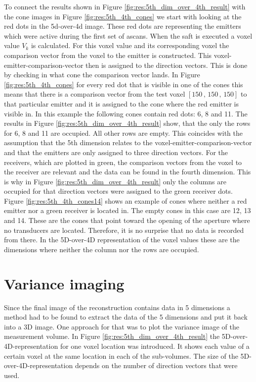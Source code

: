 To connect the results shown in Figure \ref{fig:res:5th_dim_over_4th_result} with the cone images in Figure \ref{fig:res:5th_4th_cones} we start with looking at the red dots in the 5d-over-4d image. These red dots are representing the emitters which were active during the first set of \acp{ascan}. When the \ac{saft} is executed a voxel value $V_k$ is calculated. For this voxel value and its corresponding voxel the comparison vector from the voxel to the emitter is constructed. This voxel-emitter-comparison-vector then is assigned to the direction vectors. This is done by checking in what cone the comparison vector lands. In Figure \ref{fig:res:5th_4th_cones} for every red dot that is visible in one of the cones this means that there is a comparison vector from the test voxel $[150\, , \, 150\, , \, 150]$ to that particular emitter and it is assigned to the cone where the red emitter is visible in. In this example the following cones contain red dots: 6, 8 and 11. The results in Figure \ref{fig:res:5th_dim_over_4th_result} show, that the only the rows for 6, 8 and 11 are occupied. All other rows are empty. This coincides with the assumption that the 5th dimension relates to the voxel-emitter-comparison-vector and that the emitters are only assigned to three direction vectors. 
For the receivers, which are plotted in green, the comparison vectors from the voxel to the receiver are relevant and the data can be found in the fourth dimension. This is why in Figure \ref{fig:res:5th_dim_over_4th_result} only the columns are occupied for that direction vectors were assigned to the green receiver dots. Figure \ref{fig:res:5th_4th_cones14} shows an example of cones where neither a red emitter nor a green receiver is located in. The empty cones in this case are 12, 13 and 14. These are the cones that point toward the opening of the aperture where no transducers are located. Therefore, it is no surprise that no data is recorded from there. In the 5D-over-4D representation of the voxel values these are the dimensions where neither the column nor the rows are occupied.



\section{Variance imaging}


Since the final image of the reconstruction contains data in 5 dimensions a method had to be found to extract the data of the 5 dimensions and put it back into a 3D image. One approach for that was to plot the variance image of the measurement volume. 
In Figure \ref{fig:res:5th_dim_over_4th_result} the 5D-over-4D-representation for one voxel location was introduced. It shows each value of a certain voxel at the same location in each of the sub-volumes. The size of the 5D-over-4D-representation depends on the number of direction vectors that were used.   







